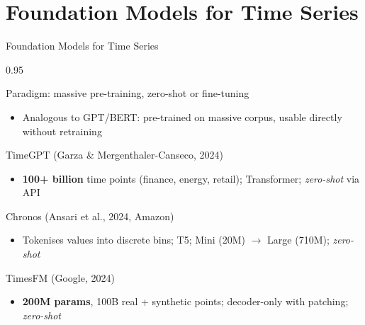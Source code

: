 \documentclass[9pt, aspectratio=169, t]{beamer}
\begin{document}
\section{Foundation Models for Time Series}

\begin{frame}{Foundation Models for Time Series}
    \vspace{-4mm}
    \begin{cminipage}{0.95\textwidth}
        {\scriptsize
        \begin{block}{Paradigm: massive pre-training, zero-shot or fine-tuning}
            \begin{itemize}\setlength{\itemsep}{0pt}
                \item Analogous to GPT/BERT: pre-trained on massive corpus, usable directly without retraining
            \end{itemize}
        \end{block}
        \vspace{-3mm}
        \begin{block}{TimeGPT (Garza \& Mergenthaler-Canseco, 2024)}
            \begin{itemize}\setlength{\itemsep}{0pt}
                \item \textbf{100+ billion} time points (finance, energy, retail); Transformer; \emph{zero-shot} via API
            \end{itemize}
        \end{block}
        \vspace{-3mm}
        \begin{block}{Chronos (Ansari et al., 2024, Amazon)}
            \begin{itemize}\setlength{\itemsep}{0pt}
                \item Tokenises values into discrete bins; T5; Mini (20M) $\to$ Large (710M); \emph{zero-shot}
            \end{itemize}
        \end{block}
        \vspace{-3mm}
        \begin{block}{TimesFM (Google, 2024)}
            \begin{itemize}\setlength{\itemsep}{0pt}
                \item \textbf{200M params}, 100B real + synthetic points; decoder-only with patching; \emph{zero-shot}
            \end{itemize}
        \end{block}
        }
    \end{cminipage}
\end{frame}
\end{document}
